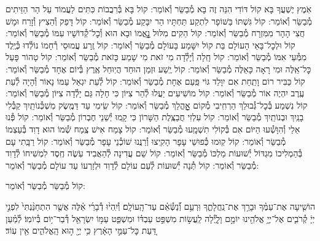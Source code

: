 \documentclass[twoside, openany, parskip=half, 11pt]{book}
\begin{document}
\begin{small}
אֹֽמֶץ יֶשְׁעֲךָ בָּא קוֹל דּוֹדִי הִנֵּה זֶה בָּא מְ֯בַשֵּׂר וְ֯אוֹמֵר:
קוֹל בָּא בְּ֯רִבֲבוֹת כִּתִּים לַעֲמוֹד עַל הַר הַזֵּיתִים מְ֯בַשֵּׂר וְ֯אוֹמֵר:
קוֹל גִּשְׁתּוֹ בַּשּׁוֹפָר לִתְקַע תַּחְתָּיו הַר יִבָּקַע מְ֯בַשֵּׂר וְ֯אוֹמֵר:
קוֹל דָּפַק וְ֯הֵצִיץ וְ֯זָרַח וּמָשׁ חֲצִי הָהָר מִמִּזְרָח מְ֯בַשֵּׂר וְ֯אוֹמֵר:
קוֹל הֵקִים מִלּוּל נׇׇׇׇׇׇאֳמוֹ וּבָא הוּא וְ֯כׇל־קְ֯דוֹשָׁיו עִמּוֹ מְ֯בַשֵּׂר וְ֯אוֹמֵר:
קוֹל וּלְכׇל־בָּאֵי הָעוֹלָם בַּת קוֹל יִשָּׁמַע בָּעוֹלָם מְ֯בַשֵּׂר וְ֯אוֹמֵר:
קוֹל זֶֽרַע עֲמוּסֵי רְ֯חָמוֹ נוֹלְ֯דוּ כְּ֯יֶֽלֶד מִמְּ֯עֵי אִמּוֹ מְ֯בַשֵּׂר וְ֯אוֹמֵר:
קוֹל חָֽלָה וְ֯יָלְ֯דָה מִי זֹאת מִי שָׁמַע כָּזֹאת מְ֯בַשֵּׂר וְ֯אוֹמֵר:
קוֹל טָהוֹר פָּעַל כׇּל־אֵֽלֶּה וּמִי רָאָה כָּאֵלֶּה מְ֯בַשֵּׂר וְ֯אוֹמֵר:
קוֹל יֶֽשַׁע וּזְמַן הוּחַד הֲיֽוּחַל אֶֽרֶץ בְּ֯יוֹם אֶחָד מְ֯בַשֵּׂר וְ֯אוֹמֵר:
קוֹל כַּבִּיר רוֹם וָתַֽחַת אִם יִוָּלֵד גּוֹי פַּֽעַם אֶחָת מְ֯בַשֵּׂר וְ֯אוֹמֵר:
קוֹל לְ֯עֵת יִגְאַל עַמּוֹ נָאוֹר וְ֯הָיָה לְ֯עֵת עֶֽרֶב יִהְיֶה אוֹר מְ֯בַשֵּׂר וְ֯אוֹמֵר:
קוֹל מוֹשִׁיעִים יַעֲלוּ לְ֯הַר צִיּוֹן כִּי חָלָה גַּם יָלְ֯דָה צִיּוֹן מְ֯בַשֵּׂר וְ֯אוֹמֵר:
קוֹל נִשְׁמַע בְּ֯כׇל־גְּ֯בוּלֵךְ הַרְחִֽיבִי מְ֯קוֹם אׇׇׇׇׇׇׇׇׇׇהֳלֵךְ מְ֯בַשֵּׂר וְ֯אוֹמֵר:
קוֹל שִֽׂימִי עַד דַּמֶּֽשֶׂק מִשְׁכְּ֯נוֹתַֽיִךְ קַבְּ֯לִי בָנַֽיִךְ וּבְנוֹתַֽיִךְ מְ֯בַשֵּׂר וְ֯אוֹמֵר:
קוֹל עִלְזִי חֲבַצֶּֽלֶת הַשָּׁרוֹן כִּי קָֽמוּ יְ֯שֵׁנֵי חֶבְרוֹן מְ֯בַשֵּׂר וְ֯אוֹמֵר:
קוֹל פְּ֯נוּ אֵלַי וְ֯הִוָּשְׁ֯עוּ הַיּוֹם אִם בְּ֯קוֹלִי תִשְׁמָֽעוּ מְ֯בַשֵּׂר וְ֯אוֹמֵר:
קוֹל צָמַח אִישׁ צֶֽמַח שְׁ֯מוֹ הוּא דָוִד בְּ֯עַצְמוֹ מְ֯בַשֵּׂר וְ֯אוֹמֵר:
קוֹל קֽוּמוּ כְּ֯פוּשֵׁי עָפָר הָקִֽיצוּ וְ֯רַנֲּנוּ שׁוֹכְ֯נֵי עָפָר מְ֯בַשֵּׂר וְ֯אוֹמֵר:
קוֹל רַבָּֽתִי עָם בְּ֯הַמְלִיכוֹ מִגְדּוֹל יְ֯שׁוּעוֹת מַלְכּוֹ מְ֯בַשֵּׂר וְ֯אוֹמֵר:
קוֹל שֵׁם עֲדִינָה לְ֯הַאֲבִיד עֹֽשֶׂה חֶֽסֶד לִמְשִׁיחוֹ לְ֯דָוִד מְ֯בַשֵּׂר וְ֯אוֹמֵר:
קוֹל תְּ֯נָה יְ֯שׁוּעוֹת לְ֯עַם עוֹלָם לְ֯דָוִד וּלְזַרְעוֹ עַד עוֹלָם מְ֯בַשֵּׂר וְ֯אוֹמֵר:

\end{small}

\begin{large}
קוֹל מְ֯בַשֵּׂר מְ֯בַשֵּׂר וְ֯אוֹמֵר:

\end{large}

הוֹשִׁ֤יעָה אֶת־עַמֶּ֗ךָ וּבָרֵ֥ךְ אֶת־נַֽחֲלָתֶ֑ךָ וּֽרְעֵ֥ם וְ֯֝נַשְּׂ֯אֵ֗ם עַד־הָֽעוֹלָֽם׃ וְ֯יִֽהְי֨וּ דְ֯בָרַ֜י אֵ֗לֶּה אֲשֶׁ֤ר הִתְחַנַּ֨נְתִּי֙ לִפְנֵ֣י יְיָ֔ קְ֯רֹבִ֛ים אֶל־יְיָ֥ אֱלֹהֵ֖ינוּ יוֹמָ֣ם וָלָ֑יְ֯לָה לַֽעֲשׂ֣וֹת מִשְׁפַּ֣ט עַבְדּ֗וֹ וּמִשְׁפַּ֛ט עַמּ֥וֹ יִשְׂרָאֵ֖ל דְּ֯בַר־י֥וֹם בְּ֯יוֹמֽוֹ׃ לְ֯מַ֗עַן דַּ֚עַת כׇּל־עַמֵּ֣י הָאָ֔רֶץ כִּ֥י יְיָ֖ ה֣וּא הָֽאֱלֹהִ֑ים אֵ֖ין עֽוֹד׃

\end{document}
